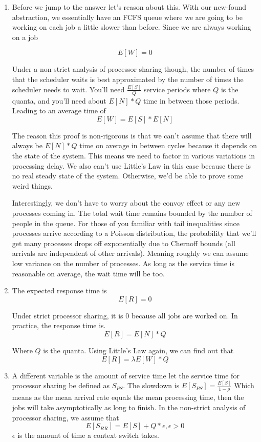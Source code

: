 \begin{enumerate}
  \item Before we jump to the answer let's reason about this.
    With our new-found abstraction, we essentially have an FCFS queue where we are going to be working on each job a little slower than before.
    Since we are always working on a job

    \[
    E[W] = 0
    \]

  Under a non-strict analysis of processor sharing though, the number of times that the scheduler waits is best approximated by the number of times the scheduler needs to wait.
  You'll need $\frac{E[S]}{Q}$ service periods where $Q$ is the quanta, and you'll need about $E[N] * Q$ time in between those periods.
  Leading to an average time of
  \[
  E[W] = E[S] * E[N]
  \]

  The reason this proof is non-rigorous is that we can't assume that there will always be $E[N] * Q$ time on average in between cycles because it depends on the state of the system.
  This means we need to factor in various variations in processing delay.
  We also can't use Little's Law in this case because there is no real steady state of the system.
  Otherwise, we'd be able to prove some weird things.

  Interestingly, we don't have to worry about the convoy effect or any new processes coming in.
  The total wait time remains bounded by the number of people in the queue.
  For those of you familiar with tail inequalities since processes arrive according to a Poisson distribution, the probability that we'll get many processes drops off exponentially due to Chernoff bounds (all arrivals are independent of other arrivals).
  Meaning roughly we can assume low variance on the number of processes.
  As long as the service time is reasonable on average, the wait time will be too.

\item The expected response time is
  \[
  E[R] = 0
  \]

  Under strict processor sharing, it is 0 because all jobs are worked on.
  In practice, the response time is.
  \[
  E[R] = E[N] * Q
  \]

  Where $Q$ is the quanta.
  Using Little's Law again, we can find out that
  \[
  E[R] = \lambda E[W] * Q
  \]
\item A different variable is the amount of service time let the service time for processor sharing be defined as $S_{PS}$.
  The slowdown is $E[S_{PS}] = \frac{E[S]}{1 - \rho}$
  Which means as the mean arrival rate equals the mean processing time, then the jobs will take asymptotically as long to finish.
  In the non-strict analysis of processor sharing, we assume that
  \[
    E[S_{RR}] = E[S] + Q * \epsilon, \epsilon > 0
  \]
    $\epsilon$ is the amount of time a context switch takes.


\end{enumerate}
